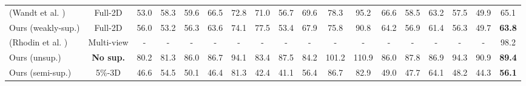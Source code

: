 \documentclass[letterpaper]{article} \usepackage{aaai20}  \usepackage{times}  \usepackage{helvet}  \usepackage{courier}  \usepackage{url}  \usepackage{graphicx}  \usepackage{amsmath}
\begin{document}
\begin{table*}[htp]
{\begin{tabular}{l|c|ccccccccccccccc|c}
({\color{coolblack}Wandt et al.} \citeyear{wandt2019repnet}) & Full-2D &  53.0 & 58.3 & 59.6 & 66.5 & 72.8 & 71.0 & 56.7 &  69.6 &  78.3 &  95.2 &  66.6 &  58.5 &  63.2 &  57.5 &  49.9 &  65.1 \\
		
		Ours (weakly-sup.) & Full-2D & 56.0 & 53.2 & 56.3 & 63.6 & 74.1 & 77.5 & 53.4 & 67.9 & 75.8 & 90.8 & 64.2 & 56.9 & 61.4 & 56.3 & 49.7 & \textbf{63.8} \\
		
        \hline
        \rowcolor{gray!10}
		({\color{coolblack}Rhodin et al.} \citeyear{rhodin2018unsupervised}) & {Multi-view} & - & - & - & - & - & - & - & - & - & - & - & - & - & - & - & 98.2 \\ 
		
		\rowcolor{gray!10}
		Ours (unsup.) & \textbf{No sup.} & 80.2 & 81.3 & 86.0 & 86.7 & 94.1 & 83.4 & 87.5 & 84.2 & 101.2 & 110.9 & 86.0 & 87.8 & 86.9 & 94.3 & 90.9 & \textbf{89.4} \\ \hline
        
        \rowcolor{gray!25}
		Ours (semi-sup.) & 5\%-3D & 46.6 & 54.5 & 50.1 & 46.4 & 81.3 & 42.4 & 41.1 & 56.4 & 86.7 & 82.9 & 49.0 & 47.7 & 64.1 & 48.2 & 44.3 & \textbf{56.1} \\
\hline
	\end{tabular}}
	\vspace{-4mm}
	\label{tab:protocol2results}
\end{table*} 
\end{document}
